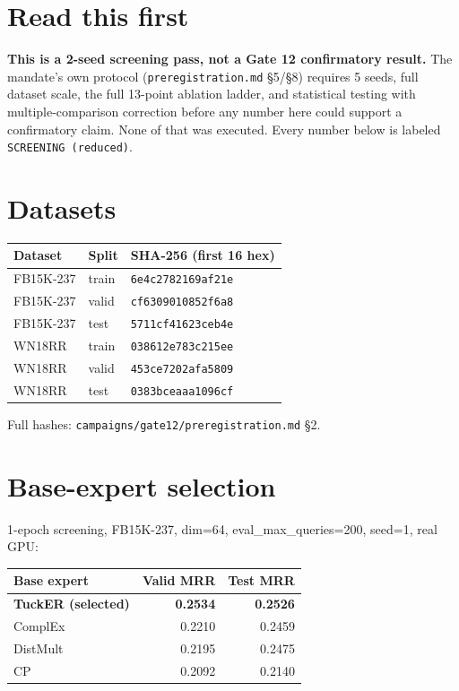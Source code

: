 \documentclass[11pt]{article}
\begin{document}

\tableofcontents

\section*{Read this first}
\textbf{This is a 2-seed screening pass, not a Gate 12 confirmatory result.} The mandate's own
protocol (\texttt{preregistration.md} \S5/\S8) requires 5 seeds, full dataset scale, the full
13-point ablation ladder, and statistical testing with multiple-comparison correction before any
number here could support a confirmatory claim. None of that was executed. Every number below is
labeled \texttt{SCREENING (reduced)}.

\section{Datasets}
\begin{center}
\begin{tabular}{lll}
\toprule
Dataset & Split & SHA-256 (first 16 hex) \\
\midrule
FB15K-237 & train & \texttt{6e4c2782169af21e} \\
FB15K-237 & valid & \texttt{cf6309010852f6a8} \\
FB15K-237 & test  & \texttt{5711cf41623ceb4e} \\
WN18RR    & train & \texttt{038612e783c215ee} \\
WN18RR    & valid & \texttt{453ce7202afa5809} \\
WN18RR    & test  & \texttt{0383bceaaa1096cf} \\
\bottomrule
\end{tabular}
\end{center}
Full hashes: \texttt{campaigns/gate12/preregistration.md} \S2.

\section{Base-expert selection}
1-epoch screening, FB15K-237, dim=64, eval\_max\_queries=200, seed=1, real GPU:
\begin{center}
\begin{tabular}{lrr}
\toprule
Base expert & Valid MRR & Test MRR \\
\midrule
\textbf{TuckER (selected)} & \textbf{0.2534} & \textbf{0.2526} \\
ComplEx & 0.2210 & 0.2459 \\
DistMult & 0.2195 & 0.2475 \\
CP & 0.2092 & 0.2140 \\
\bottomrule
\end{tabular}
\end{center}
\end{document}

